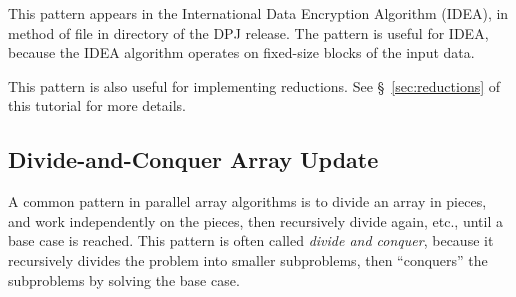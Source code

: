  This pattern appears in the International
Data Encryption Algorithm (IDEA), in method  of file
 in directory
 of the DPJ release.  The
pattern is useful for IDEA, because the IDEA algorithm operates on
fixed-size blocks of the input data.

This pattern is also useful for implementing reductions.  See
\S~\ref{sec:reductions} of this tutorial for more details.

\begin{comment}
\subsubsection{Algorithm Example:  International Data Encryption Algorithm (IDEA)%
\label{sec:array:blocked:idea}}

Now we show how the Blocked Array Update pattern can be used to
parallelize the International Data Encryption Algorithm (IDEA).  IDEA
is a block cipher code that was designed as a replacement for the Data
Encryption Standard (DES).  It operates on 64 bit blocks using a 128
bit key using a series of eight transformations.  We use Blocked Array
Update because the algorithm requires that the blocking structure be
explicit in the code, and not hidden in the runtime.

TODO: EXPLAIN FIGURE

\begin{figure}
\begin{numbereddpjlisting}
// slice has the number of blocks.
  PartitionByte<R1> inSegs  = PartitionByte.stridedPartition(plain1, slice);
  PartitionByte<R2> outSegs = PartitionByte.stridedPartition(crypt1, slice);
  foreach (int i in 0, inSegs.length)
  {
    ArraySliceByte<inSegs:[i]:*>inSeg = inSegs.get(i);
    ArraySliceByte<outSegs:[i]:*>outSeg = outSegs.get(i);
    run1(0, inSeg.length, inSeg, outSeg, Z); // do the encryption
  }

\end{numbereddpjlisting}
\caption{Blocked Array Update in IDEA.}
\label{fig:array:idea}
\end{figure}
\end{comment}

\subsection{Divide-and-Conquer Array Update%
\label{sec:array:dandc}}

A common pattern in parallel array algorithms is to divide an array in
pieces, and work independently on the pieces, then recursively divide
again, etc., until a base case is reached.  This pattern is often
called \emph{divide and conquer}, because it recursively divides the
problem into smaller subproblems, then ``conquers'' the subproblems by
solving the base case.

